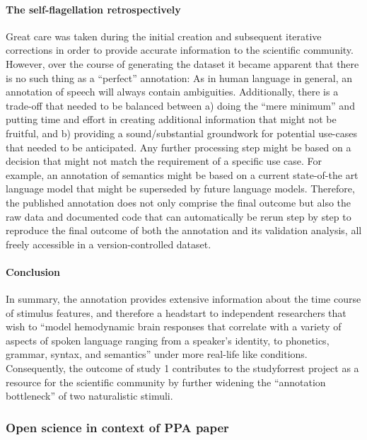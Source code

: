 \paragraph{The self-flagellation retrospectively}
%
Great care was taken during the initial creation and subsequent iterative
corrections in order to provide accurate information to the scientific
community.
%
However, over the course of generating the dataset it became apparent that there
is no such thing as a ``perfect'' annotation:
%
As in human language in general, an annotation of speech will always contain
ambiguities.
%
Additionally, there is a trade-off that needed to be balanced between a) doing
the ``mere minimum'' and putting time and effort in creating additional
information that might not be fruitful, and b) providing a sound/substantial
groundwork for potential use-cases that needed to be anticipated.
%
Any further processing step might be based on a decision that might not match
the requirement of a specific use case.
%
For example, an annotation of semantics might be based on a current state-of-the
art language model that might be superseded by future language models.
%
Therefore, the published annotation does not only comprise the final outcome but
also the raw data and documented code that can automatically be rerun step by
step to reproduce the final outcome of both the annotation and its validation
analysis, all freely accessible in a version-controlled dataset.


\paragraph{Conclusion}
%
In summary, the annotation provides extensive information about the time course
of stimulus features, and therefore a headstart to independent researchers that
wish to ``model hemodynamic brain responses that correlate with a variety of
aspects of spoken language ranging from a speaker's identity, to phonetics,
grammar, syntax, and semantics'' \citep{haeusler2021speechanno} under more
real-life like conditions.
%
Consequently, the outcome of study 1 contributes to the studyforrest project as
a resource for the scientific community by further widening the ``annotation
bottleneck'' \citep{aliko2020naturalistic} of two naturalistic stimuli.


\subsubsection{Open science in context of PPA paper}

